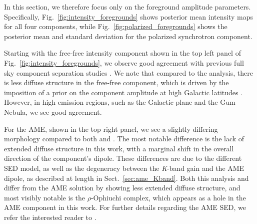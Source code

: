 \documentclass[twocolumn]{../../common/aa}
\def\WMAP{\emph{WMAP}}
\def\Planck{\emph{Planck}}
\newcommand{\K}[0]{\textit K}
\begin{document}
In this section, we therefore focus only on the foreground amplitude parameters. Specifically, Fig.~\ref{fig:intensity_foregrounds} shows posterior mean intensity maps for all four components, while Fig.~\ref{fig:polarized_foregrounds} shows the posterior mean and standard deviation for the polarized synchrotron component. 




Starting with the free-free intensity component shown in the top left panel of Fig.~\ref{fig:intensity_foregrounds}, we observe good agreement with previous full sky component separation studies \citep{planck2014-a12,bp13}. We note that compared to the \cite{planck2014-a12} analysis, there is less diffuse structure in the free-free component, which is driven by the imposition of a prior on the component amplitude at high Galactic latitudes \citep{bp13}. However, in high emission regions, such as the Galactic plane and the Gum Nebula, we see good agreement. %


For the AME, shown in the top right panel, we see a slightly differing morphology compared to both \cite{planck2014-a12} and \cite{bp13}. The most notable difference is the lack of extended diffuse structure in this work, with a marginal shift in the overall direction of the component's dipole. These differences are due to the different SED model, as well as the degeneracy between the \K-band gain and the AME dipole, as described at length in Sect.~\ref{sec:ame_Kband}. Both this analysis and \cite{bp13} differ from the \cite{planck2014-a12} AME solution by showing less extended diffuse structure, and most visibly notable is the $\rho$-Ophiuchi complex, which appears as a hole in the AME component in this work. For further details regarding the AME SED, we refer the interested reader to \citet{watts2023_ame}.
\end{document}
